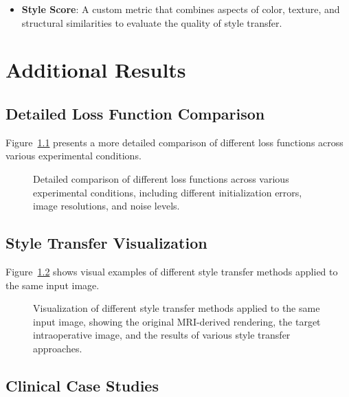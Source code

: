 \begin{appendices}
\begin{itemize}
    \item \textbf{Style Score}: A custom metric that combines aspects of color, texture, and structural similarities to evaluate the quality of style transfer.
\end{itemize}

\chapter{Additional Results}\label{appendix:results}

\section{Detailed Loss Function Comparison}\label{appendix:loss_comparison}

Figure~\ref{fig:detailed_loss_comparison} presents a more detailed comparison of different loss functions across various experimental conditions.

\begin{figure}[htpb]
  \centering
  \caption[Detailed comparison of loss functions]{Detailed comparison of different loss functions across various experimental conditions, including different initialization errors, image resolutions, and noise levels.}
  \label{fig:detailed_loss_comparison}
\end{figure}

\section{Style Transfer Visualization}\label{appendix:style_visualization}

Figure~\ref{fig:style_visualization} shows visual examples of different style transfer methods applied to the same input image.

\begin{figure}[htpb]
  \centering
  \caption[Visualization of different style transfer methods]{Visualization of different style transfer methods applied to the same input image, showing the original MRI-derived rendering, the target intraoperative image, and the results of various style transfer approaches.}
  \label{fig:style_visualization}
\end{figure}

\section{Clinical Case Studies}\label{appendix:case_studies}


\end{appendices}
